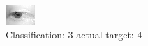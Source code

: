 \begin{figure}[h!]
\begin{center}
\includegraphics[width=0.60\columnwidth]{figures/ID2610_class_3_target_4.png}
\end{center}
\caption{ Classification: 3 actual target: 4}
\label{fig:ID2610_class_3_target_4}
\end{figure}
